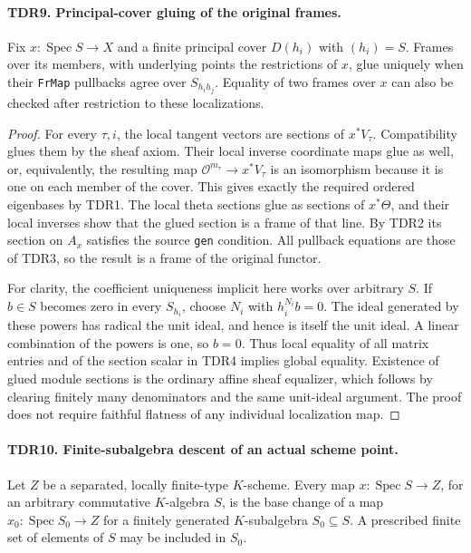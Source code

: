 \paragraph{TDR9. Principal-cover gluing of the original frames.}
\label{claim:TDR9}
Fix \(x:\operatorname{Spec}S\to X\) and a finite principal
cover \(D(h_i)\) with \((h_i)=S\).  Frames over its members,
with underlying points the restrictions of \(x\), glue uniquely
when their \texttt{FrMap} pullbacks agree over
\(S_{h_i h_j}\).  Equality of two frames over \(x\) can also
be checked after restriction to these localizations.

\begin{proof}
For every \(\tau,i\), the local tangent vectors are sections
of \(x^*V_\tau\).  Compatibility glues them by the sheaf axiom.
Their local inverse coordinate maps glue as well, or, equivalently,
the resulting map \(\mathcal O^{m_\tau}\to x^*V_\tau\)
is an isomorphism because it is one on each member of the cover.
This gives exactly the required ordered eigenbases by TDR1.
The local theta sections glue as sections of \(x^*\Theta\),
and their local inverses show that the glued section is a frame
of that line.  By TDR2 its section on \(A_x\) satisfies the
source \texttt{gen} condition.  All pullback equations are those
of TDR3, so the result is a frame of the original functor.

For clarity, the coefficient uniqueness implicit here works over
arbitrary \(S\).  If \(b\in S\) becomes zero in every
\(S_{h_i}\), choose \(N_i\) with \(h_i^{N_i}b=0\).
The ideal generated by these powers has radical the unit ideal,
and hence is itself the unit ideal.  A linear combination of the
powers is one, so \(b=0\).  Thus local equality of all matrix
entries and of the section scalar in TDR4 implies global equality.
Existence of glued module sections is the ordinary affine sheaf
equalizer, which follows by clearing finitely many denominators
and the same unit-ideal argument.  The proof does not require
faithful flatness of any individual localization map.
\end{proof}

\paragraph{TDR10. Finite-subalgebra descent of an actual scheme point.}
\label{claim:TDR10}
Let \(Z\) be a separated, locally finite-type \(K\)-scheme.
Every map \(x:\operatorname{Spec}S\to Z\), for an arbitrary
commutative \(K\)-algebra \(S\), is the base change of a map
\(x_0:\operatorname{Spec}S_0\to Z\) for a finitely generated
\(K\)-subalgebra \(S_0\subseteq S\).  A prescribed finite
set of elements of \(S\) may be included in \(S_0\).

